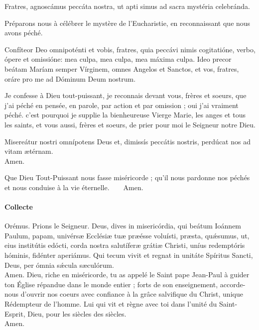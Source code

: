 \documentclass[twoside]{article}
\begin{document}
\begin{paracol}{2}
\vv Fratres, agnoscámus peccáta nostra, 
ut apti simus ad sacra mystéria celebránda.

\switchcolumn

\vv Préparons nous à célébrer le mystère de l’Eucharistie, 
en reconnaissant que nous avons péché.\newpage

\switchcolumn*

\rr Confíteor Deo omnipoténti et vobis, fratres,
quia peccávi nimis
cogitatióne, verbo, ópere et omissióne: 
mea culpa, mea culpa, mea máxima culpa. 
Ideo precor beátam Maríam semper Vírginem,
omnes Angelos et Sanctos,
et vos, fratres, oráre pro me
ad Dóminum Deum nostrum. 

\switchcolumn

\rr Je confesse à Dieu tout-puissant, 
je reconnais devant vous, frères et soeurs, que j’ai péché
en pensée, en parole, par action et par omission ; 
oui j’ai vraiment péché.
c’est pourquoi je supplie
la bienheureuse Vierge Marie,
les anges et tous les saints,
et vous aussi, frères et soeurs, 
de prier pour moi le Seigneur notre Dieu. 

\switchcolumn*

\vv Misereátur nostri omnípotens Deus
et, dimissís peccátis nostris,
perdúcat nos ad vitam ætérnam. \\
\rr Amen. 

\switchcolumn

\vv Que Dieu Tout-Puissant nous fasse miséricorde ; qu'il nous pardonne nos péchés et nous conduise à la vie éternelle.~~~~\rr Amen.


\end{paracol}


\pagebreak

\paragraph{Collecte}

\begin{paracol}{2}
\vv Orémus.
\switchcolumn
\vv Prions le Seigneur.
\switchcolumn*
Deus, dives in misericórdia, qui beátum Ioánnem Paulum, papam, univérsæ Ecclésiæ tuæ præésse voluísti, præsta, quǽsumus, ut, eius institútis edócti, corda nostra salutíferæ grátiæ Christi, uníus redemptóris hóminis, fidénter aperiámus. Qui tecum vivit et regnat in unitáte Spíritus Sancti, Deus, per ómnia sǽcula sæculórum.\\
\rr Amen.
\switchcolumn
Dieu, riche en miséricorde, tu as appelé le Saint pape Jean-Paul à guider ton Église répandue dans le monde entier ; forts de son enseignement, accorde-nous d’ouvrir nos coeurs avec confiance à la grâce salvifique du Christ, unique Rédempteur de l’homme. Lui qui vit et règne avec toi dans l’unité du Saint-Esprit, Dieu, pour les siècles des siècles.\\
\rr Amen.
\end{paracol}
\end{document}
